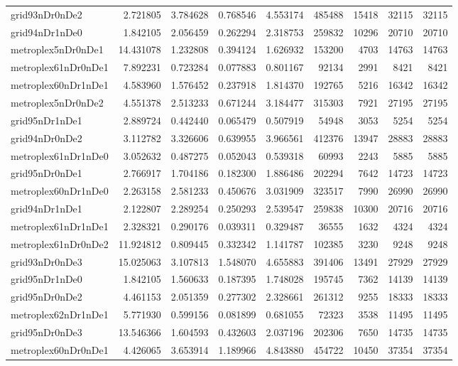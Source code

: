 \documentclass[../../../thesis.tex]{subfiles}
\begin{document}
\begin{longtable}{|l|r|r|r|r|r|r|r|r|}
grid93nDr0nDe2 & 2.721805 & 3.784628 & 0.768546 & 4.553174 & 485488 & 15418 & 32115 & 32115 \\
grid94nDr1nDe0 & 1.842105 & 2.056459 & 0.262294 & 2.318753 & 259832 & 10296 & 20710 & 20710 \\
metroplex5nDr0nDe1 & 14.431078 & 1.232808 & 0.394124 & 1.626932 & 153200 & 4703 & 14763 & 14763 \\
metroplex61nDr0nDe1 & 7.892231 & 0.723284 & 0.077883 & 0.801167 & 92134 & 2991 & 8421 & 8421 \\
metroplex60nDr1nDe1 & 4.583960 & 1.576452 & 0.237918 & 1.814370 & 192765 & 5216 & 16342 & 16342 \\
metroplex5nDr0nDe2 & 4.551378 & 2.513233 & 0.671244 & 3.184477 & 315303 & 7921 & 27195 & 27195 \\
grid95nDr1nDe1 & 2.889724 & 0.442440 & 0.065479 & 0.507919 & 54948 & 3053 & 5254 & 5254 \\
grid94nDr0nDe2 & 3.112782 & 3.326606 & 0.639955 & 3.966561 & 412376 & 13947 & 28883 & 28883 \\
metroplex61nDr1nDe0 & 3.052632 & 0.487275 & 0.052043 & 0.539318 & 60993 & 2243 & 5885 & 5885 \\
grid95nDr0nDe1 & 2.766917 & 1.704186 & 0.182300 & 1.886486 & 202294 & 7642 & 14723 & 14723 \\
metroplex60nDr1nDe0 & 2.263158 & 2.581233 & 0.450676 & 3.031909 & 323517 & 7990 & 26990 & 26990 \\
grid94nDr1nDe1 & 2.122807 & 2.289254 & 0.250293 & 2.539547 & 259838 & 10300 & 20716 & 20716 \\
metroplex61nDr1nDe1 & 2.328321 & 0.290176 & 0.039311 & 0.329487 & 36555 & 1632 & 4324 & 4324 \\
metroplex61nDr0nDe2 & 11.924812 & 0.809445 & 0.332342 & 1.141787 & 102385 & 3230 & 9248 & 9248 \\
grid93nDr0nDe3 & 15.025063 & 3.107813 & 1.548070 & 4.655883 & 391406 & 13491 & 27929 & 27929 \\
grid95nDr1nDe0 & 1.842105 & 1.560633 & 0.187395 & 1.748028 & 195745 & 7362 & 14139 & 14139 \\
grid95nDr0nDe2 & 4.461153 & 2.051359 & 0.277302 & 2.328661 & 261312 & 9255 & 18333 & 18333 \\
metroplex62nDr1nDe1 & 5.771930 & 0.599156 & 0.081899 & 0.681055 & 72323 & 3538 & 11495 & 11495 \\
grid95nDr0nDe3 & 13.546366 & 1.604593 & 0.432603 & 2.037196 & 202306 & 7650 & 14735 & 14735 \\
metroplex60nDr0nDe1 & 4.426065 & 3.653914 & 1.189966 & 4.843880 & 454722 & 10450 & 37354 & 37354 \\

\end{longtable}
\end{document}
